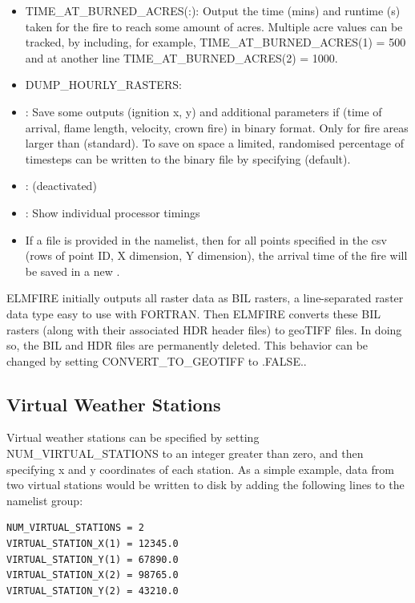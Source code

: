 \begin{itemize}
    \item TIME\_AT\_BURNED\_ACRES(:): Output the time (mins) and runtime (s) taken for the fire to reach some amount of acres. Multiple acre values can be tracked, by including, for example, TIME\_AT\_BURNED\_ACRES(1) = 500 and at another line TIME\_AT\_BURNED\_ACRES(2) = 1000.
    \item DUMP\_HOURLY\_RASTERS: 
    \item {}: Save some outputs (ignition x, y) and additional parameters if  (time of arrival, flame length, velocity, crown fire) in binary format. Only for fire areas larger than  (standard). To save on space a limited, randomised percentage of timesteps can be written to the binary file by specifying  (default).
    \item {}: (deactivated)
    \item {}: Show individual processor timings
    \item If a  file is provided in the  namelist, then for all points specified in the csv (rows of point ID, X dimension, Y dimension), the arrival time of the fire will be saved in a new .
\end{itemize}


ELMFIRE initially outputs all raster data as BIL rasters, a line-separated raster data type easy to use with FORTRAN. Then ELMFIRE converts these BIL rasters (along with their associated HDR header files) to geoTIFF files. In doing so, the BIL and HDR files are permanently deleted. This behavior can be changed by setting CONVERT\_TO\_GEOTIFF to .FALSE..

\subsection{Virtual Weather Stations}
\label{virtual_weather_stations}

Virtual weather stations can be specified by setting NUM\_VIRTUAL\_STATIONS to an integer greater than zero, and then specifying x and y coordinates of each station. As a simple example, data from two virtual stations would be written to disk by adding the following lines to the  namelist group:

\begin{verbatim}
NUM_VIRTUAL_STATIONS = 2
VIRTUAL_STATION_X(1) = 12345.0
VIRTUAL_STATION_Y(1) = 67890.0
VIRTUAL_STATION_X(2) = 98765.0
VIRTUAL_STATION_Y(2) = 43210.0
\end{verbatim}

